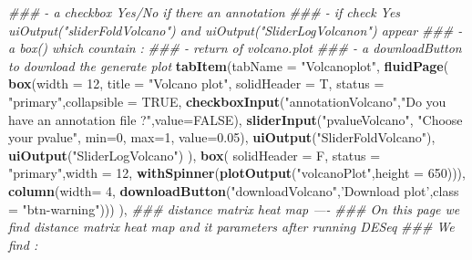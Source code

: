 \documentclass[
  12pt,
]{article}
\newenvironment{Shaded}{\begin{snugshade}}{\end{snugshade}}
\newcommand{\CommentTok}[1]{\textcolor[rgb]{0.56,0.35,0.01}{\textit{#1}}}
\newcommand{\DataTypeTok}[1]{\textcolor[rgb]{0.13,0.29,0.53}{#1}}
\newcommand{\DecValTok}[1]{\textcolor[rgb]{0.00,0.00,0.81}{#1}}
\newcommand{\FloatTok}[1]{\textcolor[rgb]{0.00,0.00,0.81}{#1}}
\newcommand{\KeywordTok}[1]{\textcolor[rgb]{0.13,0.29,0.53}{\textbf{#1}}}
\newcommand{\NormalTok}[1]{#1}
\newcommand{\OtherTok}[1]{\textcolor[rgb]{0.56,0.35,0.01}{#1}}
\newcommand{\StringTok}[1]{\textcolor[rgb]{0.31,0.60,0.02}{#1}}
\begin{document}
\begin{Shaded}
\begin{Highlighting}[]
            \CommentTok{###         - a checkbox Yes/No if there an annotation}
            \CommentTok{###           - if check Yes uiOutput("sliderFoldVolcano") and uiOutput("SliderLogVolcanon") appear}
            \CommentTok{###     - a box() which countain :}
            \CommentTok{###         - return of volcano.plot }
            \CommentTok{###     - a downloadButton to download  the generate plot}
            \KeywordTok{tabItem}\NormalTok{(}\DataTypeTok{tabName =} \StringTok{"Volcanoplot"}\NormalTok{,}
                    \KeywordTok{fluidPage}\NormalTok{(}
                      \KeywordTok{box}\NormalTok{(}\DataTypeTok{width =} \DecValTok{12}\NormalTok{,}
                          \DataTypeTok{title =} \StringTok{"Volcano plot"}\NormalTok{, }\DataTypeTok{solidHeader =}\NormalTok{ T, }\DataTypeTok{status =} \StringTok{"primary"}\NormalTok{,}\DataTypeTok{collapsible =} \OtherTok{TRUE}\NormalTok{,}
                          \KeywordTok{checkboxInput}\NormalTok{(}\StringTok{"annotationVolcano"}\NormalTok{,}\StringTok{"Do you have an annotation file ?"}\NormalTok{,}\DataTypeTok{value=}\OtherTok{FALSE}\NormalTok{),}
                          \KeywordTok{sliderInput}\NormalTok{(}\StringTok{"pvalueVolcano"}\NormalTok{, }\StringTok{"Choose your pvalue"}\NormalTok{, }\DataTypeTok{min=}\DecValTok{0}\NormalTok{, }\DataTypeTok{max=}\DecValTok{1}\NormalTok{, }\DataTypeTok{value=}\FloatTok{0.05}\NormalTok{),}
                          \KeywordTok{uiOutput}\NormalTok{(}\StringTok{"SliderFoldVolcano"}\NormalTok{),}
                          \KeywordTok{uiOutput}\NormalTok{(}\StringTok{"SliderLogVolcano"}\NormalTok{)}
\NormalTok{                      ),}
                      \KeywordTok{box}\NormalTok{( }\DataTypeTok{solidHeader =}\NormalTok{ F, }\DataTypeTok{status =} \StringTok{"primary"}\NormalTok{,}\DataTypeTok{width =} \DecValTok{12}\NormalTok{,}
                           \KeywordTok{withSpinner}\NormalTok{(}\KeywordTok{plotOutput}\NormalTok{(}\StringTok{"volcanoPlot"}\NormalTok{,}\DataTypeTok{height =} \DecValTok{650}\NormalTok{))),}
                      \KeywordTok{column}\NormalTok{(}\DataTypeTok{width=} \DecValTok{4}\NormalTok{,}
                             \KeywordTok{downloadButton}\NormalTok{(}\StringTok{"downloadVolcano"}\NormalTok{,}\StringTok{'Download plot'}\NormalTok{,}\DataTypeTok{class =} \StringTok{"btn-warning"}\NormalTok{)))}
\NormalTok{            ),}
            \CommentTok{### distance matrix heat map ----}
            \CommentTok{### On this page we find distance matrix heat map and it parameters after running DESeq}
            \CommentTok{### We find :}

\end{Highlighting}
\end{Shaded}
\end{document}

